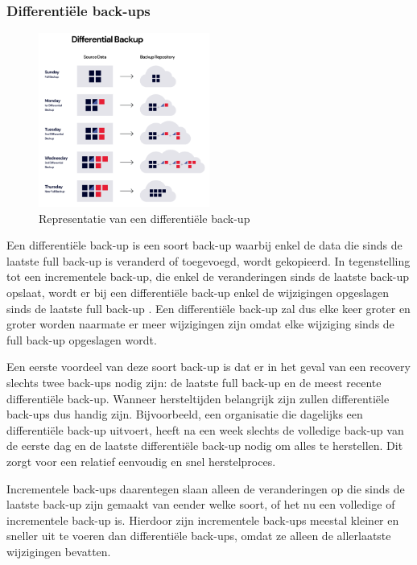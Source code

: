 \subsubsection{Differentiële back-ups}
\begin{figure}[h]
    \centering
    \captionsetup{justification=centering}
    \includegraphics[width=0.5\textwidth]{img/diff.png}  
    \caption{Representatie van een differentiële back-up \autocite{Rivas2022}}   
    \label{fig:diffrback-up}           
\end{figure}
Een differentiële back-up is een soort back-up waarbij enkel de data die sinds de laatste full back-up is veranderd of toegevoegd, wordt gekopieerd. In tegenstelling tot een incrementele back-up, die enkel de veranderingen sinds de laatste back-up opslaat, wordt er bij een differentiële back-up enkel de wijzigingen opgeslagen sinds de laatste full back-up \autocite{Zhu2015}. Een differentiële back-up zal dus elke keer groter en groter worden naarmate er meer wijzigingen zijn omdat elke wijziging sinds de full back-up opgeslagen wordt. 

Een eerste voordeel van deze soort back-up is dat er in het geval van een recovery slechts twee back-ups nodig zijn: de laatste full back-up en de meest recente differentiële back-up. Wanneer hersteltijden belangrijk zijn zullen differentiële back-ups dus handig zijn. Bijvoorbeeld, een organisatie die dagelijks een differentiële back-up uitvoert, heeft na een week slechts de volledige back-up van de eerste dag en de laatste differentiële back-up nodig om alles te herstellen. Dit zorgt voor een relatief eenvoudig en snel herstelproces. 

Incrementele back-ups daarentegen slaan alleen de veranderingen op die sinds de laatste back-up zijn gemaakt van eender welke soort, of het nu een volledige of incrementele back-up is. Hierdoor zijn incrementele back-ups meestal kleiner en sneller uit te voeren dan differentiële back-ups, omdat ze alleen de allerlaatste wijzigingen bevatten. 

